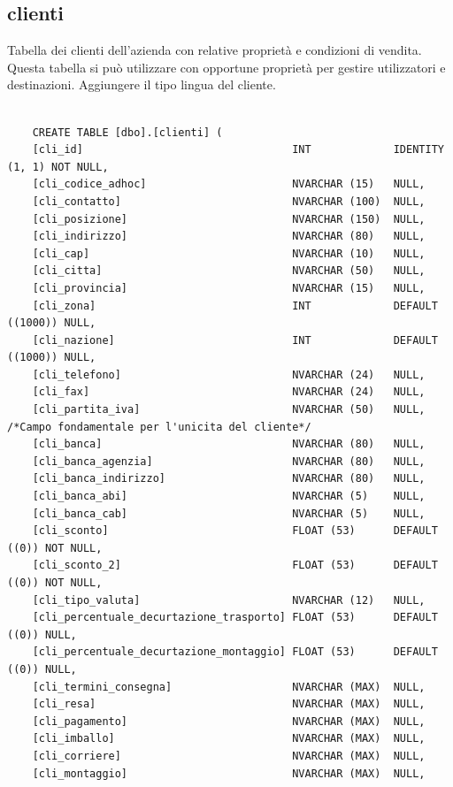 \documentclass[12pt]{article}
\begin{document}
\subsection{clienti}
Tabella dei clienti dell'azienda con relative proprietà e condizioni di vendita.
Questa tabella si può utilizzare con opportune proprietà per gestire utilizzatori e destinazioni.
Aggiungere il tipo lingua del cliente.
\begin{lstlisting}

    CREATE TABLE [dbo].[clienti] (
    [cli_id]                                 INT             IDENTITY (1, 1) NOT NULL,
    [cli_codice_adhoc]                       NVARCHAR (15)   NULL,
    [cli_contatto]                           NVARCHAR (100)  NULL,
    [cli_posizione]                          NVARCHAR (150)  NULL,
    [cli_indirizzo]                          NVARCHAR (80)   NULL,
    [cli_cap]                                NVARCHAR (10)   NULL,
    [cli_citta]                              NVARCHAR (50)   NULL,
    [cli_provincia]                          NVARCHAR (15)   NULL,
    [cli_zona]                               INT             DEFAULT ((1000)) NULL,
    [cli_nazione]                            INT             DEFAULT ((1000)) NULL,
    [cli_telefono]                           NVARCHAR (24)   NULL,
    [cli_fax]                                NVARCHAR (24)   NULL,
    [cli_partita_iva]                        NVARCHAR (50)   NULL, /*Campo fondamentale per l'unicita del cliente*/
    [cli_banca]                              NVARCHAR (80)   NULL,
    [cli_banca_agenzia]                      NVARCHAR (80)   NULL,
    [cli_banca_indirizzo]                    NVARCHAR (80)   NULL,
    [cli_banca_abi]                          NVARCHAR (5)    NULL,
    [cli_banca_cab]                          NVARCHAR (5)    NULL,
    [cli_sconto]                             FLOAT (53)      DEFAULT ((0)) NOT NULL,
    [cli_sconto_2]                           FLOAT (53)      DEFAULT ((0)) NOT NULL,
    [cli_tipo_valuta]                        NVARCHAR (12)   NULL,
    [cli_percentuale_decurtazione_trasporto] FLOAT (53)      DEFAULT ((0)) NULL,
    [cli_percentuale_decurtazione_montaggio] FLOAT (53)      DEFAULT ((0)) NULL,
    [cli_termini_consegna]                   NVARCHAR (MAX)  NULL,
    [cli_resa]                               NVARCHAR (MAX)  NULL,
    [cli_pagamento]                          NVARCHAR (MAX)  NULL,
    [cli_imballo]                            NVARCHAR (MAX)  NULL,
    [cli_corriere]                           NVARCHAR (MAX)  NULL,
    [cli_montaggio]                          NVARCHAR (MAX)  NULL,

\end{lstlisting}
\end{document}
